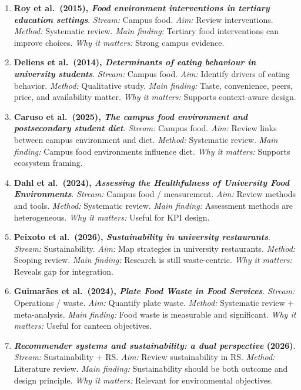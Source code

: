 \documentclass[journal]{IEEEtran}
\begin{document}
\begin{enumerate}
  healthcare RS. \emph{Method:} State-of-the-art review. \emph{Main
  finding:} Food RS fit within digital health RS. \emph{Why it matters:}
  Useful positioning paper.
\item
  \textbf{Roy et al.~(2015), \emph{Food environment interventions in
  tertiary education settings}}. \emph{Stream:} Campus food. \emph{Aim:}
  Review interventions. \emph{Method:} Systematic review. \emph{Main
  finding:} Tertiary food interventions can improve choices. \emph{Why
  it matters:} Strong campus evidence.
\item
  \textbf{Deliens et al.~(2014), \emph{Determinants of eating behaviour
  in university students}}. \emph{Stream:} Campus food. \emph{Aim:}
  Identify drivers of eating behavior. \emph{Method:} Qualitative study.
  \emph{Main finding:} Taste, convenience, peers, price, and
  availability matter. \emph{Why it matters:} Supports context-aware
  design.
\item
  \textbf{Caruso et al.~(2025), \emph{The campus food environment and
  postsecondary student diet}}. \emph{Stream:} Campus food. \emph{Aim:}
  Review links between campus environment and diet. \emph{Method:}
  Systematic review. \emph{Main finding:} Campus food environments
  influence diet. \emph{Why it matters:} Supports ecosystem framing.
\item
  \textbf{Dahl et al.~(2024), \emph{Assessing the Healthfulness of
  University Food Environments}}. \emph{Stream:} Campus food /
  measurement. \emph{Aim:} Review methods and tools. \emph{Method:}
  Systematic review. \emph{Main finding:} Assessment methods are
  heterogeneous. \emph{Why it matters:} Useful for KPI design.
\item
  \textbf{Peixoto et al.~(2026), \emph{Sustainability in university
  restaurants}}. \emph{Stream:} Sustainability. \emph{Aim:} Map
  strategies in university restaurants. \emph{Method:} Scoping review.
  \emph{Main finding:} Research is still waste-centric. \emph{Why it
  matters:} Reveals gap for integration.
\item
  \textbf{Guimarães et al.~(2024), \emph{Plate Food Waste in Food
  Services}}. \emph{Stream:} Operations / waste. \emph{Aim:} Quantify
  plate waste. \emph{Method:} Systematic review + meta-analysis.
  \emph{Main finding:} Food waste is measurable and significant.
  \emph{Why it matters:} Useful for canteen objectives.
\item
  \textbf{\emph{Recommender systems and sustainability: a dual
  perspective} (2026)}. \emph{Stream:} Sustainability + RS. \emph{Aim:}
  Review sustainability in RS. \emph{Method:} Literature review.
  \emph{Main finding:} Sustainability should be both outcome and design
  principle. \emph{Why it matters:} Relevant for environmental
  objectives.
\end{enumerate}
\end{document}
